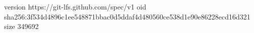 version https://git-lfs.github.com/spec/v1
oid sha256:3f534d4896c1ee548871bbac0d5ddaf4d480560ce538d1e90e86228ecd16d321
size 349692
